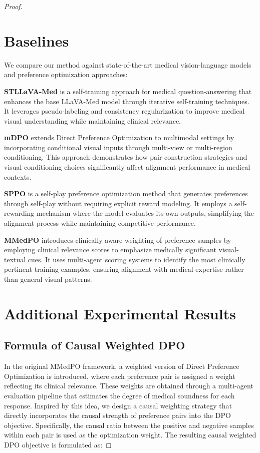 \begin{proof}
\section{Baselines}
\label{supp:baselines}

We compare our method against state-of-the-art medical vision-language models and preference optimization approaches:

\textbf{STLLaVA-Med} \cite{sun2024stllava} is a self-training approach for medical question-answering that enhances the base LLaVA-Med model through iterative self-training techniques. It leverages pseudo-labeling and consistency regularization to improve medical visual understanding while maintaining clinical relevance.

\textbf{mDPO} \cite{wang2024mdpo} extends Direct Preference Optimization to multimodal settings by incorporating conditional visual inputs through multi-view or multi-region conditioning. This approach demonstrates how pair construction strategies and visual conditioning choices significantly affect alignment performance in medical contexts.

\textbf{SPPO} \cite{wu2025selfplay} is a self-play preference optimization method that generates preferences through self-play without requiring explicit reward modeling. It employs a self-rewarding mechanism where the model evaluates its own outputs, simplifying the alignment process while maintaining competitive performance.

\textbf{MMedPO} \cite{Zhu2025MMedPO} introduces clinically-aware weighting of preference samples by employing clinical relevance scores to emphasize medically significant visual-textual cues. It uses multi-agent scoring systems to identify the most clinically pertinent training examples, ensuring alignment with medical expertise rather than general visual patterns.


\section{Additional Experimental Results}
\label{supp:cases}

\subsection{Formula of Causal Weighted DPO}
In the original MMedPO framework, a weighted version of Direct Preference Optimization is introduced, where each preference pair is assigned a weight reflecting its clinical relevance. These weights are obtained through a multi-agent evaluation pipeline that estimates the degree of medical soundness for each response. Inspired by this idea, we design a causal weighting strategy that directly incorporates the causal strength of preference pairs into the DPO objective. Specifically, the causal ratio between the positive and negative samples within each pair is used as the optimization weight. The resulting causal weighted DPO objective is formulated as:


\end{proof}

